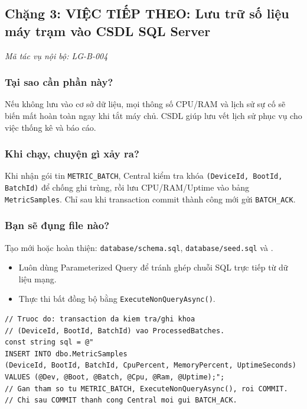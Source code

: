 \documentclass[12pt,a4paper]{article}
\begin{document}
\subsection{Chặng 3: VIỆC TIẾP THEO: Lưu trữ số liệu máy trạm vào CSDL SQL Server}
{\footnotesize\color{lgGray}\textit{Mã tác vụ nội bộ: LG-B-004}}\par
\vspace{2mm}

\subsubsection{Tại sao cần phần này?}
Nếu không lưu vào cơ sở dữ liệu, mọi thông số CPU/RAM và lịch sử sự cố sẽ biến mất hoàn toàn ngay khi tắt máy chủ. CSDL giúp lưu vết lịch sử phục vụ cho việc thống kê và báo cáo.

\subsubsection{Khi chạy, chuyện gì xảy ra?}
Khi nhận gói tin \texttt{METRIC\_BATCH}, Central kiểm tra khóa \texttt{(DeviceId, BootId, BatchId)} để chống ghi trùng, rồi lưu CPU/RAM/Uptime vào bảng \texttt{MetricSamples}. Chỉ sau khi transaction commit thành công mới gửi \texttt{BATCH\_ACK}.

\subsubsection{Bạn sẽ đụng file nào?}
Tạo mới hoặc hoàn thiện: \texttt{database/schema.sql}, \texttt{database/seed.sql} và .

\begin{orientationbox}
\begin{itemize}[leftmargin=1.5em, itemsep=1pt]
  \item Luôn dùng Parameterized Query để tránh ghép chuỗi SQL trực tiếp từ dữ liệu mạng.
  \item Thực thi bất đồng bộ bằng \texttt{ExecuteNonQueryAsync()}.
\end{itemize}
\end{orientationbox}

\begin{lstlisting}[language=CSharp, caption={Pseudocode minh họa: Ghi một mẻ telemetry theo schema đã đóng băng}]
// Truoc do: transaction da kiem tra/ghi khoa
// (DeviceId, BootId, BatchId) vao ProcessedBatches.
const string sql = @"
INSERT INTO dbo.MetricSamples
(DeviceId, BootId, BatchId, CpuPercent, MemoryPercent, UptimeSeconds)
VALUES (@Dev, @Boot, @Batch, @Cpu, @Ram, @Uptime);";
// Gan tham so tu METRIC_BATCH, ExecuteNonQueryAsync(), roi COMMIT.
// Chi sau COMMIT thanh cong Central moi gui BATCH_ACK.
\end{lstlisting}
\end{document}
